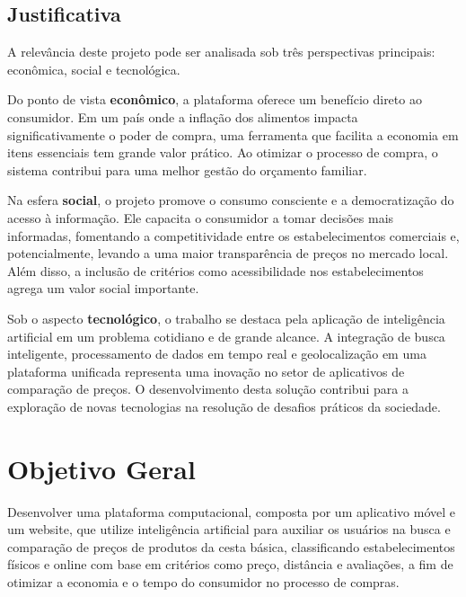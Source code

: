 \documentclass[
  article,      %
  a4paper,      %
  12pt,         %
  oneside,      %
  fleqn         %
]{abntex2}
\begin{document}
\subsection{Justificativa}

A relevância deste projeto pode ser analisada sob três perspectivas principais: econômica, social e tecnológica.

Do ponto de vista \textbf{econômico}, a plataforma oferece um benefício direto ao consumidor. Em um país onde a inflação dos alimentos impacta significativamente o poder de compra, uma ferramenta que facilita a economia em itens essenciais tem grande valor prático. Ao otimizar o processo de compra, o sistema contribui para uma melhor gestão do orçamento familiar.

Na esfera \textbf{social}, o projeto promove o consumo consciente e a democratização do acesso à informação. Ele capacita o consumidor a tomar decisões mais informadas, fomentando a competitividade entre os estabelecimentos comerciais e, potencialmente, levando a uma maior transparência de preços no mercado local. Além disso, a inclusão de critérios como acessibilidade nos estabelecimentos agrega um valor social importante.

Sob o aspecto \textbf{tecnológico}, o trabalho se destaca pela aplicação de inteligência artificial em um problema cotidiano e de grande alcance. A integração de busca inteligente, processamento de dados em tempo real e geolocalização em uma plataforma unificada representa uma inovação no setor de aplicativos de comparação de preços. O desenvolvimento desta solução contribui para a exploração de novas tecnologias na resolução de desafios práticos da sociedade.

\section{Objetivo Geral}

Desenvolver uma plataforma computacional, composta por um aplicativo móvel e um website, que utilize inteligência artificial para auxiliar os usuários na busca e comparação de preços de produtos da cesta básica, classificando estabelecimentos físicos e online com base em critérios como preço, distância e avaliações, a fim de otimizar a economia e o tempo do consumidor no processo de compras.

\postextual
\printbibliography

\end{document}
